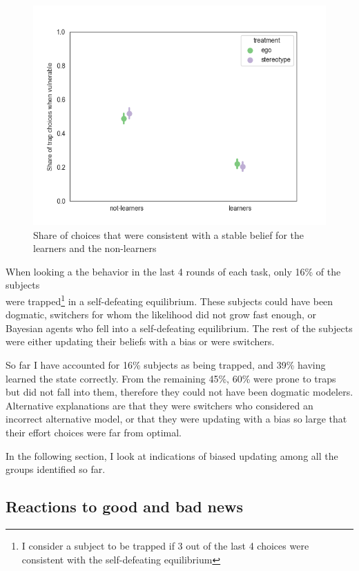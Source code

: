 \documentclass[
  12pt,
]{article}
\begin{document}
\begin{figure}
\hypertarget{fig:traps-choice}{%
\centering
\includegraphics{../figures/trap_choice.png}
\caption{Share of choices that were consistent with a stable belief for
the learners and the non-learners}\label{fig:traps-choice}
}
\end{figure}

When looking a the behavior in the last 4 rounds of each task, only 16\%
of the subjects\\
were
trapped\footnote{I consider a subject to be trapped if 3 out of the last 4 choices were consistent 
with the self-defeating equilibrium} in a self-defeating equilibrium.
These subjects could have been dogmatic, switchers for whom the
likelihood did not grow fast enough, or Bayesian agents who fell into a
self-defeating equilibrium. The rest of the subjects were either
updating their beliefs with a bias or were switchers.

So far I have accounted for 16\% subjects as being trapped, and 39\%
having learned the state correctly. From the remaining 45\%, 60\% were
prone to traps but did not fall into them, therefore they could not have
been dogmatic modelers. Alternative explanations are that they were
switchers who considered an incorrect alternative model, or that they
were updating with a bias so large that their effort choices were far
from optimal.

In the following section, I look at indications of biased updating among
all the groups identified so far.

\hypertarget{reactions-to-good-and-bad-news}{%
\subsection{Reactions to good and bad
news}\label{reactions-to-good-and-bad-news}}
\end{document}

